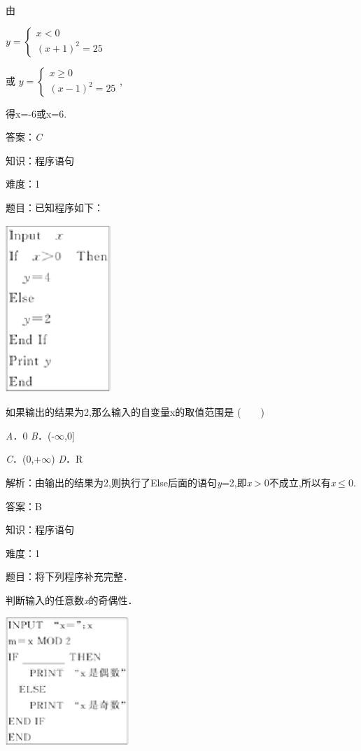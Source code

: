 \documentclass{article} %
\begin{document}
由

$y=\left\{
\begin{array}{l}
x<0\\
(x+1)^2=25
\end{array}
\right.$

或
$y=\left\{
\begin{array}{l}
x\ge0\\
(x-1)^2=25
\end{array}
\right.$,

得x=-6或x=6.

答案：\textit{C}

知识：程序语句

难度：1

题目：已知程序如下：

\includegraphics*[width=1.57in, height=2.50in, keepaspectratio=false]{image48}

如果输出的结果为2,那么输入的自变量x的取值范围是 (　　)

\textit{A}．0          \textit{B}．(-$\mathrm{\infty}$,0]

\textit{C}．(0,+$\mathrm{\infty}$)   \textit{D}．R

解析：由输出的结果为2,则执行了Else后面的语句\textit{y}=2,即\textit{x}$\mathrm{>}$0不成立,所以有\textit{x}$\mathrm{\le}$0.

答案：B

知识：程序语句

难度：1

题目：将下列程序补充完整．

判断输入的任意数\textit{x}的奇偶性．

\includegraphics*[width=1.84in, height=1.92in, keepaspectratio=false]{image49}
\end{document}
